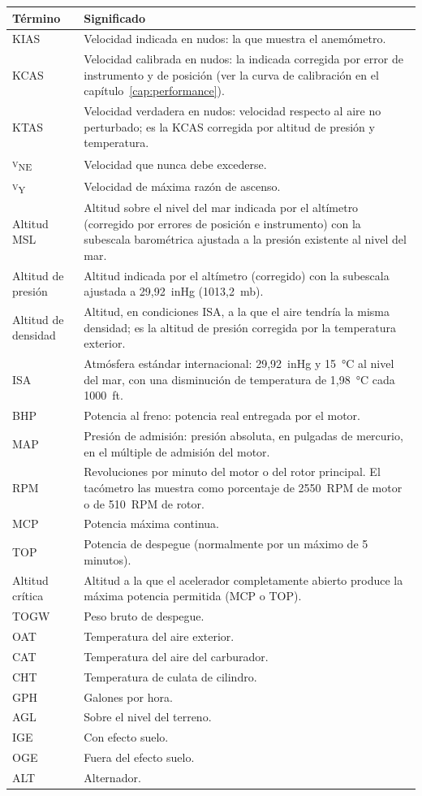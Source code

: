 \begin{longtable}{@{}L{1.9cm}p{\dimexpr\linewidth-1.9cm-2\tabcolsep}@{}}
\toprule
Término & Significado \\
\midrule
\endhead
KIAS & Velocidad indicada en nudos: la que muestra el anemómetro. \\
KCAS & Velocidad calibrada en nudos: la indicada corregida por error de instrumento y de posición (ver la curva de calibración en el capítulo~\ref{cap:performance}). \\
KTAS & Velocidad verdadera en nudos: velocidad respecto al aire no perturbado; es la KCAS corregida por altitud de presión y temperatura. \\
\textsc{v}\textsubscript{NE} & Velocidad que nunca debe excederse. \\
\textsc{v}\textsubscript{Y} & Velocidad de máxima razón de ascenso. \\
Altitud MSL & Altitud sobre el nivel del mar indicada por el altímetro (corregido por errores de posición e instrumento) con la subescala barométrica ajustada a la presión existente al nivel del mar. \\
Altitud de presión & Altitud indicada por el altímetro (corregido) con la subescala ajustada a 29,92~inHg (1013,2~mb). \\
Altitud de densidad & Altitud, en condiciones ISA, a la que el aire tendría la misma densidad; es la altitud de presión corregida por la temperatura exterior. \\
ISA & Atmósfera estándar internacional: 29,92~inHg y 15~°C al nivel del mar, con una disminución de temperatura de 1,98~°C cada 1000~ft. \\
BHP & Potencia al freno: potencia real entregada por el motor. \\
MAP & Presión de admisión: presión absoluta, en pulgadas de mercurio, en el múltiple de admisión del motor. \\
RPM & Revoluciones por minuto del motor o del rotor principal. El tacómetro las muestra como porcentaje de 2550~RPM de motor o de 510~RPM de rotor. \\
MCP & Potencia máxima continua. \\
TOP & Potencia de despegue (normalmente por un máximo de 5 minutos). \\
Altitud crítica & Altitud a la que el acelerador completamente abierto produce la máxima potencia permitida (MCP o TOP). \\
TOGW & Peso bruto de despegue. \\
OAT & Temperatura del aire exterior. \\
CAT & Temperatura del aire del carburador. \\
CHT & Temperatura de culata de cilindro. \\
GPH & Galones por hora. \\
AGL & Sobre el nivel del terreno. \\
IGE & Con efecto suelo. \\
OGE & Fuera del efecto suelo. \\
ALT & Alternador. \\
\bottomrule
\end{longtable}

